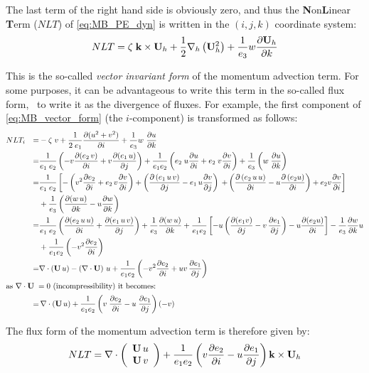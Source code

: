 \documentclass[../main/NEMO_manual]{subfiles}
\begin{document}
The last term of the right hand side is obviously zero,
and thus the \textbf{N}on\textbf{L}inear \textbf{T}erm ($NLT$) of \autoref{eq:MB_PE_dyn} is written in
the $(i,j,k)$ coordinate system:
\begin{equation}
  \label{eq:MB_vector_form}
  NLT = \zeta \; \vect k \times \vect U_h + \frac{1}{2} \nabla_h \lt( \vect U_h^2 \rt) + \frac{1}{e_3} w \pd[\vect U_h]{k}
\end{equation}

This is the so-called \textit{vector invariant form} of the momentum advection term.
For some purposes, it can be advantageous to write this term in the so-called flux form,
\ie\ to write it as the divergence of fluxes.
For example,
the first component of \autoref{eq:MB_vector_form} (the $i$-component) is transformed as follows:
\begin{alignat*}{3}
  &NLT_i &= &- \zeta \; v + \frac{1}{2 \; e_1} \pd[ (u^2 + v^2) ]{i} + \frac{1}{e_3} w \ \pd[u]{k} \\
  &      &= &\frac{1}{e_1 \; e_2} \lt( -v \pd[(e_2 \, v)]{i} + v \pd[(e_1 \, u)]{j} \rt) + \frac{1}{e_1 e_2} \lt( e_2 \; u \pd[u]{i} + e_2 \; v \pd[v]{i} \rt) + \frac{1}{e_3} \lt( w \; \pd[u]{k} \rt) \\
  &      &= &\frac{1}{e_1 \; e_2} \lt[ - \lt( v^2 \pd[e_2]{i} + e_2 \, v \pd[v]{i} \rt) + \lt( \pd[ \lt( e_1 \, u \, v \rt)]{j} - e_1 \, u \pd[v]{j} \rt) \rt. \lt. + \lt( \pd[ \lt( e_2 \, u \, u \rt)]{i} - u \pd[ \lt( e_2 u \rt)]{i} \rt) + e_2 v \pd[v]{i} \rt] \\
  &      & &+ \frac{1}{e_3} \lt( \pd[(w \, u)]{k} - u \pd[w]{k} \rt) \\
  &      &= &\frac{1}{e_1 \; e_2} \lt( \pd[(e_2 \, u \, u)]{i} + \pd[(e_1 \, u \, v)]{j} \rt) + \frac{1}{e_3} \pd[(w \, u)]{k} + \frac{1}{e_1 e_2} \lt[ - u \lt( \pd[(e_1 v)]{j} - v \, \pd[e_1]{j} \rt) - u \pd[(e_2 u)]{i} \rt] - \frac{1}{e_3} \pd[w]{k} u \\
  &      & &+ \frac{1}{e_1 e_2} \lt( - v^2 \pd[e_2]{i} \rt) \\
  &      &= &\nabla \cdot (\vect U \, u) - (\nabla \cdot \vect U) \ u + \frac{1}{e_1 e_2} \lt( -v^2 \pd[e_2]{i} + u v \, \pd[e_1]{j} \rt) \\
  \shortintertext{as $\nabla \cdot {\vect U} \; = 0$ (incompressibility) it becomes:}
  &      &= &\, \nabla \cdot (\vect U \, u) + \frac{1}{e_1 e_2} \lt( v \; \pd[e_2]{i} - u \; \pd[e_1]{j} \rt) (-v)
\end{alignat*}

The flux form of the momentum advection term is therefore given by:
\begin{equation}
  \label{eq:MB_flux_form}
  NLT = \nabla \cdot \lt(
  \begin{array}{*{20}c}
    \vect U \, u \\
    \vect U \, v
  \end{array}
  \rt)
  + \frac{1}{e_1 e_2} \lt( v \pd[e_2]{i} - u \pd[e_1]{j} \rt) \vect k \times \vect U_h
\end{equation}
\end{document}
